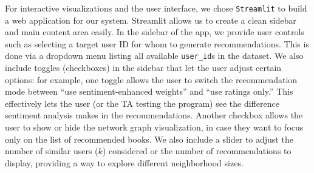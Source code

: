 \documentclass[11pt]{article}
\begin{document}
For interactive visualizations and the user interface, we chose \texttt{Streamlit} to build a web application for our system. Streamlit allows us to create a clean sidebar and main content area easily. In the sidebar of the app, we provide user controls such as selecting a target user ID for whom to generate recommendations. This is done via a dropdown menu listing all available \texttt{user\_id}s in the dataset. We also include toggles (checkboxes) in the sidebar that let the user adjust certain options: for example, one toggle allows the user to switch the recommendation mode between “use sentiment-enhanced weights” and “use ratings only.” This effectively lets the user (or the TA testing the program) see the difference sentiment analysis makes in the recommendations. Another checkbox allows the user to show or hide the network graph visualization, in case they want to focus only on the list of recommended books. We also include a slider to adjust the number of similar users ($k$) considered or the number of recommendations to display, providing a way to explore different neighborhood sizes.
\end{document}
